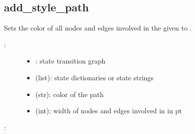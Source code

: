 \documentclass[letterpaper,10pt,english]{sphinxmanual}
\begin{document}
\subsection{add\_style\_path}
\label{\detokenize{StateTransitionGraphs:stgs-add-style-path}}\label{\detokenize{StateTransitionGraphs:add-style-path}}

\begin{fulllineitems}
\label{\detokenize{StateTransitionGraphs:PyBoolNet.StateTransitionGraphs.add_style_path}}
Sets the color of all nodes and edges involved in the given  to .
\begin{description}
\item[{:}] \leavevmode\begin{itemize}
\item {} 
: state transition graph

\item {} 
 (list): state dictionaries or state strings

\item {} 
 (str): color of the path

\item {} 
 (int): width of nodes and edges involved in  in pt

\end{itemize}

\end{description}

:

\begin{sphinxVerbatim}[commandchars=\\\{\}]
  \PYG{p}{[}  \PYG{p}{]}
  
\end{sphinxVerbatim}

\end{fulllineitems}
\end{document}
